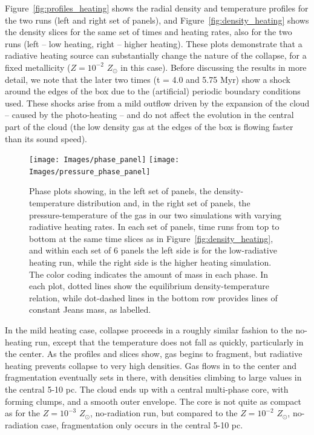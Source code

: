 \documentclass[useAMS,usenatbib]{mn2e}
\begin{document}

Figure~\ref{fig:profiles_heating} shows the radial density and temperature profiles for the two runs (left and right set of panels),
and Figure~\ref{fig:density_heating} shows the density slices for the same set of times and heating rates, also for the two runs
(left -- low heating, right -- higher heating). These plots demonstrate that a radiative heating source can substantially change
the nature of the collapse, for a fixed metallicity ($Z=10^{-2}$ $Z_\odot$ in this case).   Before discussing the results in more detail,
we note that the later two times (t = 4.0 and 5.75 Myr) show a shock around the edges of the box due to the (artificial) periodic
boundary conditions used.   These shocks arise from a mild outflow driven by the expansion of the cloud -- caused by the photo-heating --
and do not affect the evolution in the central part of the cloud (the low density gas at the edges of the box is flowing faster than its sound speed).

\begin{figure}
\begin{center}
\hspace{-0.4cm}
\texttt{[image: Images/phase\_panel]} \hspace{-1cm}
\texttt{[image: Images/pressure\_phase\_panel]} \hspace{-1.5cm}
\end{center}
\caption{\label{fig:phase_panels} Phase plots showing, in the left set of panels, the density-temperature distribution and, in the right set of panels, the pressure-temperature of the gas in our two simulations with varying radiative heating rates.   In each set of panels, time runs from top to bottom at the same time slices as in Figure~\ref{fig:density_heating}, and within each set of 6 panels the left side is for the low-radiative heating run, while the right side is the higher heating simulation.  The color coding indicates the amount of mass in each phase.   In each plot, dotted lines show the equilibrium density-temperature relation, while dot-dashed lines in the bottom row provides lines of constant Jeans mass, as labelled.}
\end{figure}

In the mild heating case, collapse proceeds in a roughly similar fashion to the no-heating run, except that the temperature does not fall as quickly,
particularly in the center. As the profiles and slices show, gas begins to fragment, but radiative heating prevents collapse to very high densities.
Gas flows in to the center and fragmentation eventually sets in there, with densities climbing to large values in the central 5-10 pc. The cloud
ends up with a central multi-phase core, with forming clumps, and a smooth outer envelope. The core is not quite as compact as for the
$Z=10^{-3}$ $Z_\odot$, no-radiation run, but compared to the $Z=10^{-2}$ $Z_\odot$, no-radiation case, fragmentation only occurs in the central 5-10 pc.
\end{document}
